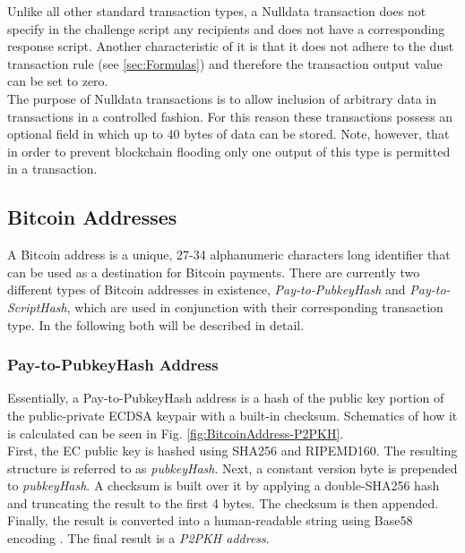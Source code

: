 \noindent
Unlike all other standard transaction types, a Nulldata transaction does not specify in the challenge script any recipients and does not have a corresponding response script. Another characteristic of it is that it does not adhere to the dust transaction rule (see \ref{sec:Formulas}) and therefore the transaction output value can be set to zero.~\\

\noindent
The purpose of Nulldata transactions is to allow inclusion of arbitrary data in transactions in a controlled fashion. For this reason these transactions possess an optional field in which up to 40 bytes of data can be stored. Note, however, that in order to prevent blockchain flooding only one output of this type is permitted in a transaction.


\clearpage
\subsection{Bitcoin Addresses} \label{sec:BitcoinAddresses}
A Bitcoin address is a unique, 27-34 alphanumeric characters long identifier that can be used as a destination for Bitcoin payments. There are currently two different types of Bitcoin addresses in existence, \emph{Pay-to-PubkeyHash} and \emph{Pay-to-ScriptHash}, which are used in conjunction with their corresponding transaction type. In the following both will be described in detail.

\subsubsection{Pay-to-PubkeyHash Address} \label{sec:Address-P2PKH}
Essentially, a Pay-to-PubkeyHash address is a hash of the public key portion of the public-private ECDSA keypair with a built-in checksum. Schematics of how it is calculated can be seen in Fig. \ref{fig:BitcoinAddress-P2PKH}.~\\

\noindent
First, the EC public key is hashed using SHA256 and RIPEMD160. The resulting structure is referred to as \textit{pubkeyHash}. Next, a constant version byte is prepended to \textit{pubkeyHash}. A checksum is built over it by applying a double-SHA256 hash and truncating the result to the first 4 bytes. The checksum is then appended. Finally, the result is converted into a human-readable string using Base58 encoding \cite{Base58}. The final result is a \emph{P2PKH address}.

